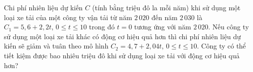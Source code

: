 \begin{bt}%
	Chi phí nhiên liệu dự kiến $C$ (tính bằng triệu đô la mỗi năm) khi sử dụng một loại xe tải của một công ty vận tải từ năm $2\,020$ đến năm $2\,030$ là $C_1=5{,}6+ 2{,}2t$, $0\le t\le 10$ trong đó $t = 0$ tương ứng với năm $2\,020$. Nếu công ty sử dụng một loại xe tải khác có động cơ hiệu quả hơn  thì chi phí nhiên liệu dự kiến sẽ giảm và tuân theo mô hình $C_2=4{,}7+ 2{,}04t$, $0\le t\le 10$. Công ty có thể tiết kiệm được bao nhiêu triệu đô khi sử dụng loại xe tải với động cơ hiệu quả hơn?
\end{bt}

